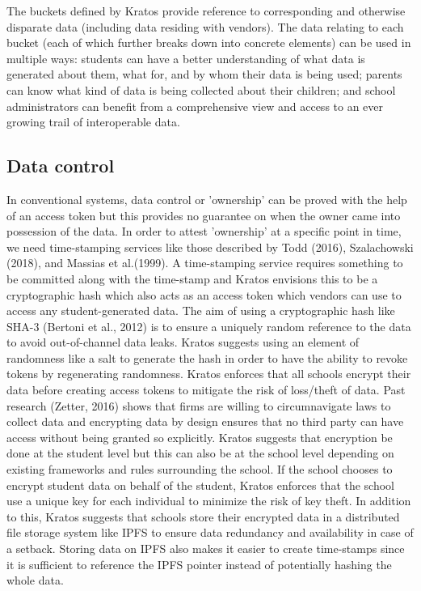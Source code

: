 \documentclass{article}
\begin{document}
\bigbreak
The buckets defined by Kratos provide reference to corresponding and otherwise disparate data (including data residing with vendors). The data relating to each bucket (each of which further breaks down into concrete elements) can be used in multiple ways: students can have a better understanding of what data is generated about them, what for, and by whom their data is being used; parents can know what kind of data is being collected about their children; and school administrators can benefit from a comprehensive view and access to an ever growing trail of interoperable data. 

\subsection{Data control}
In conventional systems, data control or 'ownership' can be proved with the help of an access token but this provides no guarantee on when the owner came into possession of the data. In order to attest 'ownership' at a specific point in time, we need time-stamping services like those described by Todd (2016), Szalachowski (2018), and Massias et al.(1999). A time-stamping service requires something to be committed along with the time-stamp and Kratos envisions this to be a cryptographic hash which also acts as an access token which vendors can use to access any student-generated data.
\bigbreak
The aim of using a cryptographic hash like SHA-3 (Bertoni et al., 2012) is to ensure a uniquely random reference to the data to avoid out-of-channel data leaks. Kratos suggests using an element of randomness like a salt to generate the hash in order to have the ability to revoke tokens by regenerating randomness. Kratos enforces that all schools encrypt their data before creating access tokens to mitigate the risk of loss/theft of data. Past research (Zetter, 2016) shows that firms are willing to circumnavigate laws to collect data and encrypting data by design ensures that no third party can have access without being granted so explicitly.
\bigbreak
Kratos suggests that encryption be done at the student level but this can also be at the school level depending on existing frameworks and rules surrounding the school. If the school chooses to encrypt student data on behalf of the student, Kratos enforces that the school use a unique key for each individual to minimize the risk of key theft. In addition to this, Kratos suggests that schools store their encrypted data in a distributed file storage system like IPFS to ensure data redundancy and availability in case of a setback. Storing data on IPFS also makes it easier to create time-stamps since it is sufficient to reference the IPFS pointer instead of potentially hashing the whole data.
\end{document}

